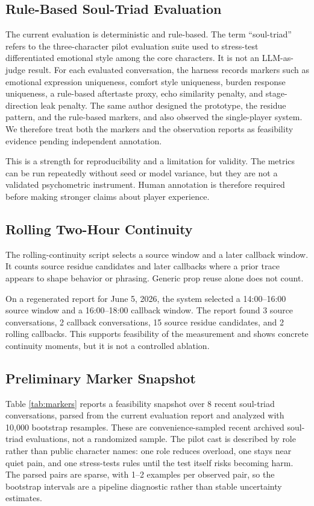 \documentclass[11pt]{article}
\begin{document}
\subsection{Rule-Based Soul-Triad Evaluation}

The current evaluation is deterministic and rule-based. The term ``soul-triad'' refers to the three-character pilot evaluation suite used to stress-test differentiated emotional style among the core characters. It is not an LLM-as-judge result. For each evaluated conversation, the harness records markers such as emotional expression uniqueness, comfort style uniqueness, burden response uniqueness, a rule-based aftertaste proxy, echo similarity penalty, and stage-direction leak penalty. The same author designed the prototype, the residue pattern, and the rule-based markers, and also observed the single-player system. We therefore treat both the markers and the observation reports as feasibility evidence pending independent annotation.

This is a strength for reproducibility and a limitation for validity. The metrics can be run repeatedly without seed or model variance, but they are not a validated psychometric instrument. Human annotation is therefore required before making stronger claims about player experience.

\subsection{Rolling Two-Hour Continuity}

The rolling-continuity script selects a source window and a later callback window. It counts source residue candidates and later callbacks where a prior trace appears to shape behavior or phrasing. Generic prop reuse alone does not count.

On a regenerated report for June 5, 2026, the system selected a 14:00--16:00 source window and a 16:00--18:00 callback window. The report found 3 source conversations, 2 callback conversations, 15 source residue candidates, and 2 rolling callbacks. This supports feasibility of the measurement and shows concrete continuity moments, but it is not a controlled ablation.

\subsection{Preliminary Marker Snapshot}

Table \ref{tab:markers} reports a feasibility snapshot over 8 recent soul-triad conversations, parsed from the current evaluation report and analyzed with 10,000 bootstrap resamples. These are convenience-sampled recent archived soul-triad evaluations, not a randomized sample. The pilot cast is described by role rather than public character names: one role reduces overload, one stays near quiet pain, and one stress-tests rules until the test itself risks becoming harm. The parsed pairs are sparse, with 1--2 examples per observed pair, so the bootstrap intervals are a pipeline diagnostic rather than stable uncertainty estimates.
\end{document}
